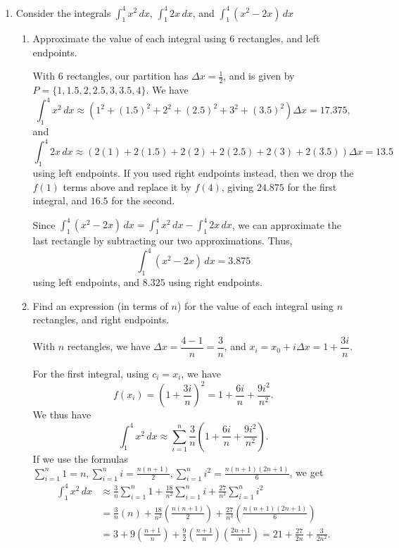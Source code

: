 \documentclass[12pt]{article}
\newcommand{\di}{\displaystyle}
\begin{document}
\thispagestyle{fancy}

\begin{enumerate}
 \item Consider the integrals $\displaystyle \int_1^4 x^2\,dx$, $\displaystyle \int_1^4 2x\,dx$, and $\displaystyle \int_1^4 (x^2-2x)\,dx$
\begin{enumerate}
 \item Approximate the value of each integral using 6 rectangles, and left endpoints.

\medskip

With 6 rectangles, our partition has $\Delta x = \frac{1}{2}$, and is given by $P = \{1,1.5, 2, 2.5, 3, 3.5, 4\}$. We have
\[
 \int_1^4 x^2\,dx \approx \left(1^2+(1.5)^2+2^2+(2.5)^2+3^2+(3.5)^2\right)\Delta x = 17.375,
\]
and
\[
 \int_1^4 2x \,dx \approx\left(2(1)+2(1.5)+2(2)+2(2.5)+2(3)+2(3.5)\right)\Delta x = 13.5
\]
using left endpoints. If you used right endpoints instead, then we drop the $f(1)$ terms above and replace it by $f(4)$, giving $24.875$ for the first integral, and $16.5$ for the second.

Since $\int_1^4(x^2-2x)\,dx = \int_1^4 x^2\,dx - \int_1^4 2x\,dx$, we can approximate the last rectangle by subtracting our two approximations. Thus,
\[
 \int_1^4(x^2-2x)\,dx = 3.875
\]
using left endpoints, and $8.325$ using right endpoints.

\medskip

 \item Find an expression (in terms of $n$) for the value of each integral using $n$ rectangles, and right endpoints.

With $n$ rectangles, we have $\Delta x = \dfrac{4-1}{n} = \dfrac{3}{n}$, and $x_i = x_0+i\Delta x = 1+\dfrac{3i}{n}$.

For the first integral, using $c_i=x_{i}$, we have
\[
 f(x_{i}) = \left(1+\dfrac{3i}{n}\right)^2 = 1+\frac{6i}{n}+\frac{9i^2}{n^2}.
\]
We thus have
\[
 \int_1^4 x^2\,dx \approx \sum_{i=1}^n\frac{3}{n}\left(1+\frac{6i}{n}+\frac{9i^2}{n^2}\right).
\]
If we use the formulas $\di \sum_{i=1}^n 1 = n, \sum_{i=1}^n i = \frac{n(n+1)}{2}, \sum_{i=1}^n i^2 = \frac{n(n+1)(2n+1)}{6}$, we get
\begin{align*}
 \int_1^4 x^2\,dx &\approx \frac{3}{n}\sum_{i=1}^n 1+\frac{18}{n^2}\sum_{i=1}^n i + \frac{27}{n^3}\sum_{i=1}^n i^2\\
 &= \frac{3}{n}(n)+\frac{18}{n^2}\left(\frac{n(n+1)}{2}\right)+\frac{27}{n^3}\left(\frac{n(n+1)(2n+1)}{6}\right)\\
 &= 3+9\left(\frac{n+1}{n}\right)+\frac{9}{2}\left(\frac{n+1}{n}\right)\left(\frac{2n+1}{n}\right) = 21+\frac{27}{2n}+\frac{3}{2n^2}.
\end{align*}


\end{enumerate}
\end{enumerate}
\end{document}
